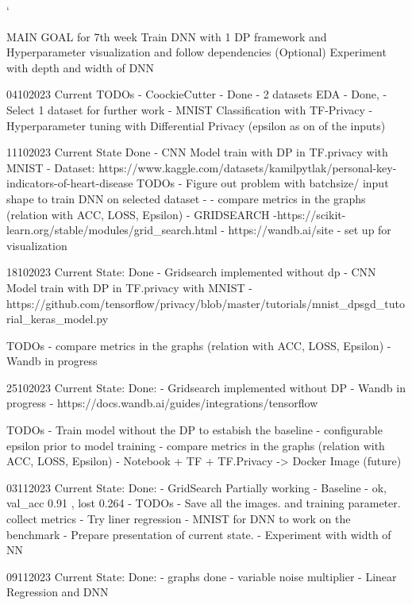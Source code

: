 `%


MAIN GOAL for 7th week
Train DNN with 1 DP framework and Hyperparameter visualization and follow dependencies
(Optional) Experiment with depth and width of DNN


04102023 Current TODOs
 - CoockieCutter - Done
 - 2 datasets EDA - Done, 
    - Select 1 dataset for further work
 - MNIST Classification with TF-Privacy
 - Hyperparameter tuning with Differential Privacy (epsilon as on of the inputs)

 11102023 Current State
Done
- CNN Model train with DP in TF.privacy with MNIST
- Dataset: https://www.kaggle.com/datasets/kamilpytlak/personal-key-indicators-of-heart-disease
TODOs
 - Figure out problem with batchsize/ input shape to train DNN on selected dataset - 
 - compare metrics in the graphs (relation with ACC, LOSS, Epsilon)
 - GRIDSEARCH -https://scikit-learn.org/stable/modules/grid_search.html
 - https://wandb.ai/site - set up for visualization

 18102023 Current State:
 Done 
 - Gridsearch implemented without dp
 - CNN Model train with DP in TF.privacy with MNIST
 - https://github.com/tensorflow/privacy/blob/master/tutorials/mnist_dpsgd_tutorial_keras_model.py

TODOs
- compare metrics in the graphs (relation with ACC, LOSS, Epsilon)
- Wandb in progress


25102023 Current State:
Done:
 - Gridsearch implemented without DP
 - Wandb in progress
 - https://docs.wandb.ai/guides/integrations/tensorflow

TODOs
- Train model without the DP to estabish the baseline
- configurable epsilon prior to model training 
- compare metrics in the graphs (relation with ACC, LOSS, Epsilon)
- Notebook + TF + TF.Privacy -> Docker Image (future)


03112023 Current State:
Done:
 - GridSearch Partially working
 - Baseline - ok, val_acc 0.91 , lost 0.264
 - 
 TODOs
 - Save all the images. and training parameter. collect metrics
 - Try liner regression
 - MNIST for DNN to work on the benchmark
 - Prepare presentation of current state. 
 - Experiment with width of NN

 09112023 Current State:
 Done:
 - graphs done
 - variable noise multiplier
 - Linear Regression and DNN

